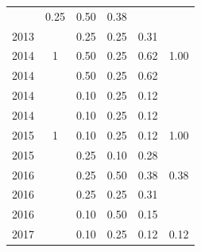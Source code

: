 \begin{table}[H]
\begin{tabular}{| l | c | c | c | c | c |}
          &
          0.25
          &
          0.50
          &
          0.38
          &
          \\
            2013
          &
          
          &
          0.25
          &
          0.25
          &
          0.31
          &
          \\
\hline
            2014
          &
          1
          &
          0.50
          &
          0.25
          &
          0.62
          &
            {\color{blue} 1.00}
          \\
            2014
          &
          
          &
          0.50
          &
          0.25
          &
          0.62
          &
          \\
            2014
          &
          
          &
          0.10
          &
          0.25
          &
          0.12
          &
          \\
            2014
          &
          
          &
          0.10
          &
          0.25
          &
          0.12
          &
          \\
\hline
            2015
          &
          1
          &
          0.10
          &
          0.25
          &
          0.12
          &
            {\color{blue} 1.00}
          \\
            2015
          &
          
          &
          0.25
          &
          0.10
          &
          0.28
          &
          \\
\hline
            2016
          &
          
          &
          0.25
          &
          0.50
          &
          0.38
          &
            {\color{red} 0.38}
          \\
            2016
          &
          
          &
          0.25
          &
          0.25
          &
          0.31
          &
          \\
            2016
          &
          
          &
          0.10
          &
          0.50
          &
          0.15
          &
          \\
\hline
            2017
          &
          
          &
          0.10
          &
          0.25
          &
          0.12
          &
            {\color{red} 0.12}
          \\
\hline
\end{tabular}
\end{table}

